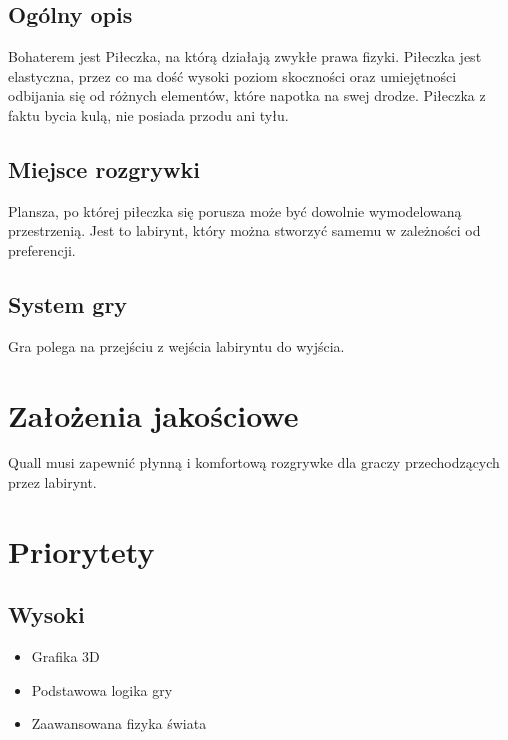 \documentclass[12pt,a4paper,twoside]{article}
\begin{document}
\subsection{Ogólny opis}
Bohaterem jest Piłeczka, na którą działają zwykłe prawa fizyki. Piłeczka jest elastyczna, przez co ma dość wysoki poziom skoczności oraz umiejętności odbijania się od różnych elementów, które napotka na swej drodze. Piłeczka z faktu bycia kulą, nie posiada przodu ani tyłu.

\subsection{Miejsce rozgrywki}
Plansza, po której piłeczka się porusza może być dowolnie wymodelowaną przestrzenią. Jest to labirynt, który można stworzyć samemu w zależności od preferencji.

\subsection{System gry}
Gra polega na przejściu z wejścia labiryntu do wyjścia.



\section{Założenia jakościowe}
Quall musi zapewnić płynną i komfortową rozgrywke dla graczy przechodzących przez labirynt.


\section{Priorytety}
\subsection{Wysoki}
\begin{itemize}
\item Grafika 3D
\item Podstawowa logika gry
\item Zaawansowana fizyka świata
\end{itemize}
\end{document}
